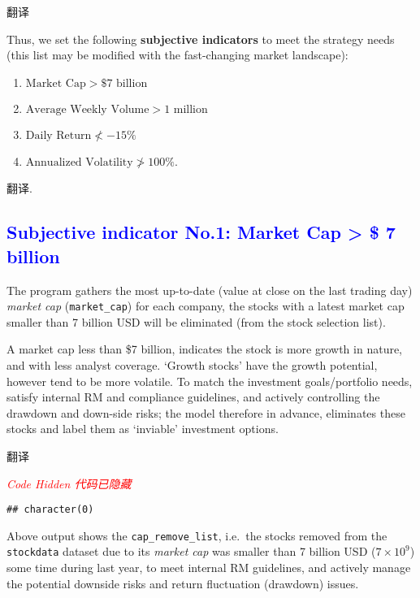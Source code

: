 \documentclass[
]{book}
\providecommand{\tightlist}{%
  \setlength{\itemsep}{0pt}\setlength{\parskip}{0pt}}
\begin{document}
翻译

Thus, we set the following \textbf{subjective indicators} to meet the
strategy needs (this list may be modified with the fast-changing market
landscape):

\begin{enumerate}
\def\labelenumi{(\arabic{enumi})}
\tightlist
\item
  \(\text{Market Cap}> \$ 7 \text{ billion}\)\\
\item
  \(\text{Average Weekly Volume}> 1 \text{ million}\)\\
\item
  \(\text{Daily Return} \nless -15\%\)\\
\item
  \(\text{Annualized Volatility}\ngtr 100\%\).
\end{enumerate}

翻译.

\hypertarget{section}{%
\subsection{\texorpdfstring{\textcolor{blue}{Subjective indicator No.1: Market Cap > \$ 7 billion}}{}}\label{section}}

The program gathers the most up-to-date (value at close on the last
trading day) \emph{market cap} (\texttt{market\_cap}) for each company,
the stocks with a latest market cap smaller than 7 billion USD will be
eliminated (from the stock selection list).

A market cap less than \$7 billion, indicates the stock is more growth
in nature, and with less analyst coverage. `Growth stocks' have the
growth potential, however tend to be more volatile. To match the
investment goals/portfolio needs, satisfy internal RM and compliance
guidelines, and actively controlling the drawdown and down-side risks;
the model therefore in advance, eliminates these stocks and label them
as `inviable' investment options.

翻译

\emph{\textcolor{red}{Code Hidden 代码已隐藏}}

\begin{verbatim}
## character(0)
\end{verbatim}

Above output shows the \texttt{cap\_remove\_list}, i.e.~the stocks
removed from the \texttt{stockdata} dataset due to its \emph{market cap}
was smaller than 7 billion USD (\(7\times 10^9\)) some time during last
year, to meet internal RM guidelines, and actively manage the potential
downside risks and return fluctuation (drawdown) issues.
\end{document}
